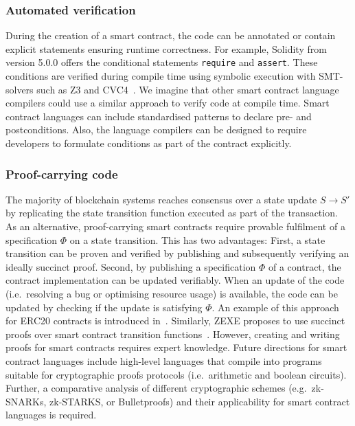 
\subsubsection{Automated verification}
During the creation of a smart contract, the code can be annotated or contain explicit statements ensuring runtime correctness.
For example, Solidity from version 5.0.0 offers the conditional statements \texttt{require} and \texttt{assert}.
These conditions are verified during compile time using symbolic execution with SMT-solvers such as Z3 and CVC4~\cite{Alt2018}.
We imagine that other smart contract language compilers could use a similar approach to verify code at compile time.
Smart contract languages can include standardised patterns to declare pre- and postconditions.
Also, the language compilers can be designed to require developers to formulate conditions as part of the contract explicitly.

\subsubsection{Proof-carrying code}
The majority of blockchain systems reaches consensus over a state update $S \rightarrow S'$ by replicating the state transition function executed as part of the transaction. 
As an alternative, proof-carrying smart contracts require provable fulfilment of a specification $\Phi$ on a state transition. 
This has two advantages: First, a state transition can be proven and verified by publishing and subsequently verifying an ideally succinct proof. 
Second, by publishing a specification $\Phi$ of a contract, the contract implementation can be updated verifiably.
When an update of the code (i.e.\ resolving a bug or optimising resource usage) is available, the code can be updated by checking if the update is satisfying $\Phi$.
An example of this approach for ERC20 contracts is introduced in~\cite{Dickerson2018}.
Similarly, ZEXE proposes to use succinct proofs over smart contract transition functions~\cite{Bowe2018}.
However, creating and writing proofs for smart contracts requires expert knowledge.
Future directions for smart contract languages include high-level languages that compile into programs suitable for cryptographic proofs protocols (i.e.\ arithmetic and boolean circuits).
Further, a comparative analysis of different cryptographic schemes (e.g.\ zk-SNARKs, zk-STARKS, or Bulletproofs) and their applicability for smart contract languages is required.


